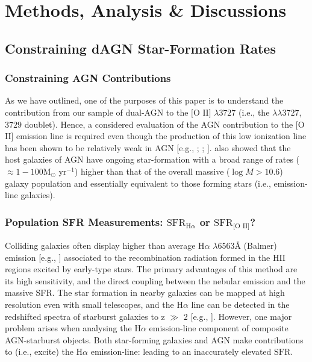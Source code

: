 \section{Methods, Analysis \& Discussions}
\subsection{Constraining dAGN Star-Formation Rates}
\subsubsection{Constraining AGN Contributions}

As we have outlined, one of the purposes of this paper is to understand the contribution from our sample of dual-AGN to the $\text{[O II]}$ $\lambda{3727}$ (i.e., the $\lambda\lambda{3727}$,$3729$ doublet). Hence, a considered evaluation of the AGN contribution to the [O II] emission line is required even though the production of this low ionization line has been shown to be relatively weak in AGN [e.g., \cite{Ferland_1986}; \cite{Ho_1993}; \cite{2006ApJ...642..702K}]. \cite{2009ApJ...696..396S} also showed that the host galaxies of AGN have ongoing star-formation with a broad range of rates ($\approx{1-100}$M$_{\odot}$ yr$^{-1}$) higher than that of the overall massive ($\log{M}>{10.6}$) galaxy population and essentially equivalent to those forming stars (i.e., emission-line galaxies).

\subsubsection{Population SFR Measurements: $\text{SFR}_{\text{H}\alpha}$ or $\text{SFR}_{\text{[O II]}}$?}

Colliding galaxies often display higher than average $\text{H}\alpha$ $\lambda 6563${\AA } (Balmer) emission [e.g., \cite{Kennicutt_1987}] associated to the recombination radiation formed in the HII regions excited by early-type stars. The primary advantages of this method are its high sensitivity, and the direct coupling between the nebular emission and the massive SFR. The star formation in nearby galaxies can be mapped at high resolution even with small telescopes, and the $\text{H}\alpha$ line can be detected in the redshifted spectra of starburst galaxies to z $\gg$ 2 [e.g., \cite{1997ApJ...477L..29B}]. However, one major problem arises when analysing the $\text{H}\alpha$ emission-line component of composite AGN-starburst objects. Both star-forming galaxies and AGN make contributions to (i.e., excite) the $\text{H}\alpha$ emission-line: leading to an inaccurately elevated $\text{SFR}$. 

